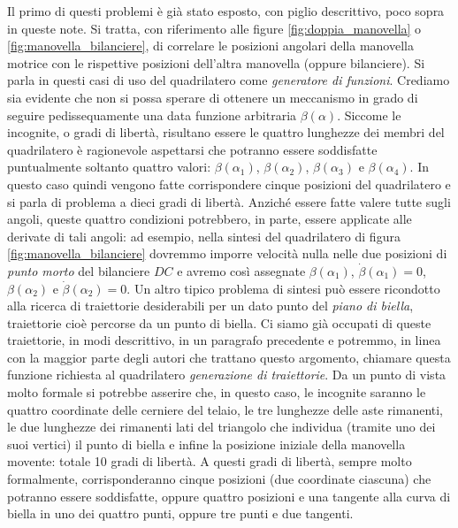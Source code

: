 \noindent Il primo di questi problemi \`e gi\`a stato esposto, con piglio descrittivo,
poco sopra in queste note. Si tratta, con riferimento alle figure
\ref{fig:doppia_manovella} o \ref{fig:manovella_bilanciere}, di correlare le posizioni
angolari della manovella motrice con le rispettive posizioni dell'altra manovella
(oppure bilanciere). Si parla in questi casi di uso del quadrilatero come
{\em generatore di funzioni}. Crediamo sia evidente
che non si possa sperare di ottenere un meccanismo in grado di seguire
pedissequamente una data funzione arbitraria $\beta(\alpha)$. Siccome le incognite,
o gradi di libert\`a,
risultano essere le quattro lunghezze dei membri del quadrilatero \`e ragionevole
aspettarsi che potranno essere soddisfatte puntualmente soltanto quattro valori:
$\beta(\alpha_1)$, $\beta(\alpha_2)$, $\beta(\alpha_3)$ e $\beta(\alpha_4)$.
In questo caso quindi vengono fatte corrispondere cinque posizioni del quadrilatero e 
si parla di problema a dieci gradi di libert\`a.
Anzich\'e essere fatte valere tutte sugli angoli, queste quattro condizioni potrebbero,
in parte, essere  applicate alle
derivate di tali angoli: ad esempio, nella sintesi del quadrilatero di figura
\ref{fig:manovella_bilanciere} dovremmo imporre velocit\`a nulla nelle due posizioni
di {\em punto morto} del bilanciere $DC$ e avremo cos\`i assegnate
$\beta(\alpha_1)$, ${\dot\beta}(\alpha_1)=0$, $\beta(\alpha_2)$ e ${\dot\beta}(\alpha_2)=0$. 
\noindent Un altro tipico problema di sintesi pu\`o essere ricondotto alla ricerca 
di traiettorie desiderabili per un dato punto del {\em piano di biella}, traiettorie
cio\`e percorse da un punto di biella. Ci siamo gi\`a occupati di queste traiettorie,
in modi descrittivo, in un paragrafo precedente e potremmo, in linea con la maggior parte
degli autori che trattano questo argomento, chiamare questa funzione richiesta al
quadrilatero {\em generazione di traiettorie}.
Da un punto di vista molto formale si potrebbe asserire che, in questo caso,
le incognite
saranno le quattro coordinate delle cerniere del telaio, le tre lunghezze delle
aste rimanenti, le due lunghezze dei rimanenti lati del triangolo che individua (tramite
uno dei suoi vertici) il punto di biella e infine la posizione iniziale della 
manovella movente: totale 10 gradi di libert\`a. A questi gradi di libert\`a,
sempre molto formalmente, corrisponderanno cinque posizioni (due coordinate ciascuna)
che potranno essere soddisfatte, oppure quattro posizioni e una tangente alla curva
di biella in uno dei quattro punti, oppure tre punti e due tangenti.
 
